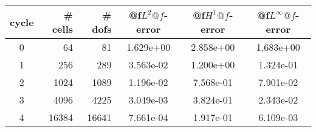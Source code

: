 \documentclass[10pt]{report}
\begin{document}
\begin{table}[H]
\begin{center}
\begin{tabular}{|c|r|r|c|c|c|} \hline
cycle & \# cells & \# dofs & @f$L^2@f$-error & @f$H^1@f$-error & @f$L^\infty@f$-error\\ \hline
0 & 64 & 81 & 1.629e+00 & 2.858e+00 & 1.683e+00\\ \hline
1 & 256 & 289 & 3.563e-02 & 1.200e+00 & 1.324e-01\\ \hline
2 & 1024 & 1089 & 1.196e-02 & 7.568e-01 & 7.901e-02\\ \hline
3 & 4096 & 4225 & 3.049e-03 & 3.824e-01 & 2.343e-02\\ \hline
4 & 16384 & 16641 & 7.661e-04 & 1.917e-01 & 6.109e-03\\ \hline
\end{tabular}
\end{center}
\end{table}
\end{document}
